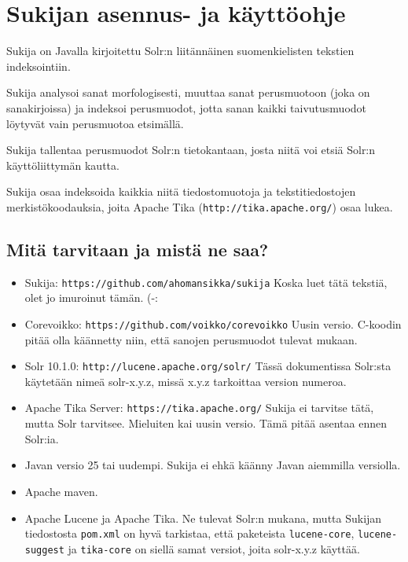 \documentclass[12pt]{article}
\begin{document}
\pagestyle{fancy}
\setlength{\parindent}{0pt}
\setlength{\parskip}{1ex plus 0.5ex minus 0.2ex}
\section*{Sukijan asennus- ja käyttöohje}


Sukija on Javalla kirjoitettu Solr:n liitännäinen suomenkielisten
tekstien indeksointiin.

Sukija analysoi sanat morfologisesti, muuttaa sanat perusmuotoon (joka
on sanakirjoissa) ja indeksoi perusmuodot, jotta sanan kaikki
taivutusmuodot löytyvät vain perusmuotoa etsimällä.

Sukija tallentaa perusmuodot Solr:n tietokantaan, josta niitä voi
etsiä Solr:n käyttöliittymän kautta.

Sukija osaa indeksoida kaikkia niitä tiedostomuotoja ja
tekstitiedostojen merkistökoodauksia, joita Apache Tika
(\verb=http://tika.apache.org/=) osaa lukea.


\subsection*{Mitä tarvitaan ja mistä ne saa?}

\begin{itemize}
\item Sukija:
      \verb=https://github.com/ahomansikka/sukija=
      Koska luet tätä tekstiä, olet jo imuroinut tämän. (-:

\item Corevoikko:
      \verb=https://github.com/voikko/corevoikko=
      Uusin versio. C-koodin pitää olla käännetty niin,
      että sanojen perusmuodot tulevat mukaan.

\item Solr 10.1.0:
      \verb=http://lucene.apache.org/solr/=
      Tässä dokumentissa Solr:sta käytetään nimeä solr-x.y.z,
      missä x.y.z tarkoittaa version numeroa.

\item Apache Tika Server:
      \verb=https://tika.apache.org/=
      Sukija ei tarvitse tätä, mutta Solr tarvitsee.
      Mieluiten kai uusin versio. Tämä pitää asentaa ennen Solr:ia.

\item Javan versio 25 tai uudempi. Sukija ei ehkä käänny Javan aiemmilla versiolla.

\item Apache maven.

\item Apache Lucene ja Apache Tika.
      Ne tulevat Solr:n mukana, mutta Sukijan tiedostosta \verb=pom.xml=
      on hyvä tarkistaa, että paketeista \verb=lucene-core=,
      \verb=lucene-suggest= ja \verb=tika-core= on siellä samat versiot,
      joita solr-x.y.z käyttää.
\end{itemize}
\end{document}
